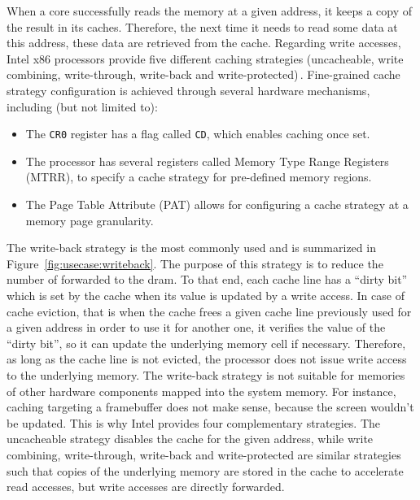 When a core successfully reads the memory at a given address, it keeps a
copy of the result in its caches.
%
Therefore, the next time it needs to read some data at this address, these data
are retrieved from the cache.
%
Regarding write accesses, Intel x86 processors provide five different caching
strategies (uncacheable, write combining, write-through, write-back and
write-protected)\,\cite[Volume 3, Chapter~11]{intel2014manual}.
%
Fine-grained cache strategy configuration is achieved through several hardware
mechanisms, including (but not limited to):
%
\begin{itemize}
\item The \texttt{CR0} register has a flag called \texttt{CD}, which enables
  caching once set.
%
\item The processor has several registers called Memory Type Range Registers
  (MTRR), to specify a cache strategy for pre-defined memory regions.
%
\item The Page Table Attribute (PAT) allows for configuring a cache strategy at
  a memory page granularity.
\end{itemize}
%
The write-back strategy is the most commonly used and is summarized in
Figure~\ref{fig:usecase:writeback}.
%
The purpose of this strategy is to reduce the number of \IO forwarded to the
\ac{dram}.
%
To that end, each cache line has a ``dirty bit'' which is set by the cache when
its value is updated by a write access.
%
In case of cache eviction, that is when the cache frees a given cache line
previously used for a given address in order to use it for another one, it
verifies the value of the ``dirty bit'', so it can update the underlying memory
cell if necessary.
%
Therefore, as long as the cache line is not evicted, the processor does not
issue write access to the underlying memory.
%
The write-back strategy is not suitable for memories of other hardware
components mapped into the system memory.
%
For instance, caching \IOs targeting a framebuffer does not make sense, because
the screen wouldn't be updated.
%
This is why Intel provides four complementary strategies.
%
The uncacheable strategy disables the cache for the given address, while write
combining, write-through, write-back and write-protected are similar strategies
such that copies of the underlying memory are stored in the cache to accelerate
read accesses, but write accesses are directly forwarded.


